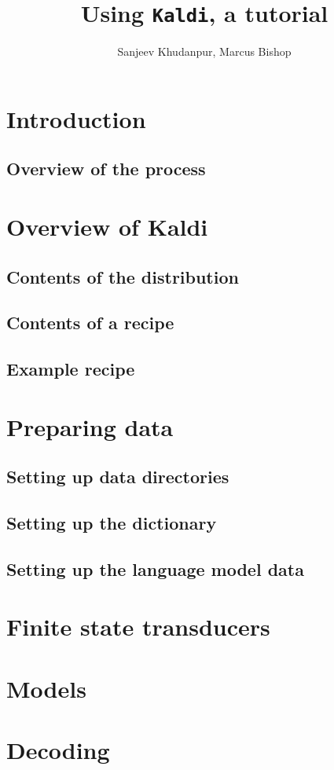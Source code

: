 \documentclass[12pt]{article}
\title{Using \texttt{Kaldi}, a tutorial}
\author{Sanjeev Khudanpur, Marcus Bishop}
\begin{document}
\maketitle

\section{Introduction}

\subsection{Overview of the process}


\section{Overview of \textsf{Kaldi}}

\subsection{Contents of the distribution}

\subsection{Contents of a recipe}

\subsection{Example recipe}


\section{Preparing data}\label{data}

\subsection{Setting up data directories}

\subsection{Setting up the dictionary}\label{dict}

\subsection{Setting up the language model data}


\section{Finite state transducers}\label{fst}

\section{Models}\label{model}
\section{Decoding}\label{decode}



\end{document}
